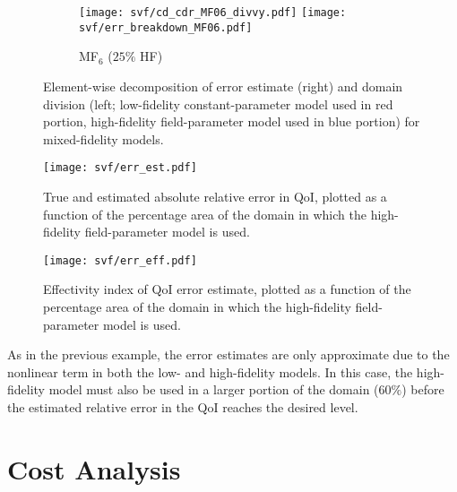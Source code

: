 \begin{figure}[h!]
\begin{subfigure}[b]{\textwidth}
  \vspace{0.8\baselineskip}
\end{subfigure}
\begin{subfigure}[b]{\textwidth}
	\centering
	\texttt{[image: svf/cd\_cdr\_MF06\_divvy.pdf]}
  \texttt{[image: svf/err\_breakdown\_MF06.pdf]}
  \vspace{-0.7\baselineskip}
  \caption{MF$_6$ ($25\%$ HF)}
\end{subfigure}
\caption{Element-wise decomposition of error estimate (right) and domain division (left; low-fidelity constant-parameter model used in red portion, high-fidelity field-parameter model used in blue portion) for mixed-fidelity models.}
\label{fig:svfRef}
\end{figure}

\begin{figure}[h]
\centering
\texttt{[image: svf/err\_est.pdf]}
\caption{True and estimated absolute relative error in QoI, plotted as a function of the percentage area of the domain in which the high-fidelity field-parameter model is used.}
\label{fig:svfErr}
\end{figure}

\begin{figure}[h]
\centering
\texttt{[image: svf/err\_eff.pdf]}
\caption{Effectivity index of QoI error estimate, plotted as a function of the percentage area of the domain in which the high-fidelity field-parameter model is used.}
\label{fig:svfErrEff}
\end{figure}

As in the previous example, the error estimates are only approximate due to the nonlinear term in both the low- and high-fidelity models. In this case, the high-fidelity model must also be used in a larger portion of the domain ($60\%$) before the estimated relative error in the QoI reaches the desired level.

\section{Cost Analysis} \label{sec:costAnaly}

